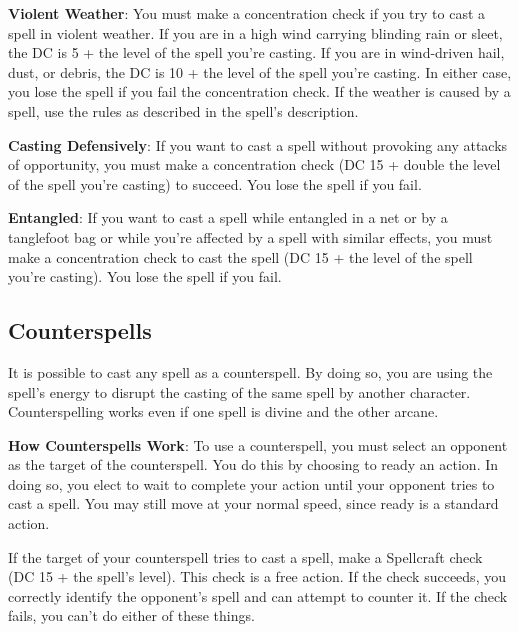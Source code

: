 \textbf{Violent Weather}: You must make a concentration check if you try to cast a spell in violent weather. If you are in a high wind carrying blinding rain or sleet, the DC is 5 + the level of the spell you're casting. If you are in wind-driven hail, dust, or debris, the DC is 10 + the level of the spell you're casting. In either case, you lose the spell if you fail the concentration check. If the weather is caused by a spell, use the rules as described in the spell's description.
				
\textbf{Casting Defensively}: If you want to cast a spell without provoking any attacks of opportunity, you must make a concentration check (DC 15 + double the level of the spell you're casting) to succeed. You lose the spell if you fail.
				
\textbf{Entangled}: If you want to cast a spell while entangled in a net or by a tanglefoot bag or while you're affected by a spell with similar effects, you must make a concentration check to cast the spell (DC 15 + the level of the spell you're casting). You lose the spell if you fail.
				
\subsection{Counterspells}


It is possible to cast any spell as a counterspell. By doing so, you are using the spell's energy to disrupt the casting of the same
spell by another character. Counterspelling works even if one spell is divine and the other arcane.
				
\textbf{How Counterspells Work}: To use a counterspell, you must select an opponent as the target of the counterspell. You do this by
choosing to ready an action. In doing so, you elect to wait to complete your action until your opponent tries to cast a spell. You
may still move at your normal speed, since ready is a standard action.

If the target of your counterspell tries to cast a spell, make a Spellcraft check (DC 15 + the spell's level). This check is a free
action. If the check succeeds, you correctly identify the opponent's spell and can attempt to counter it. If the check fails, you
can't do either of these things.

